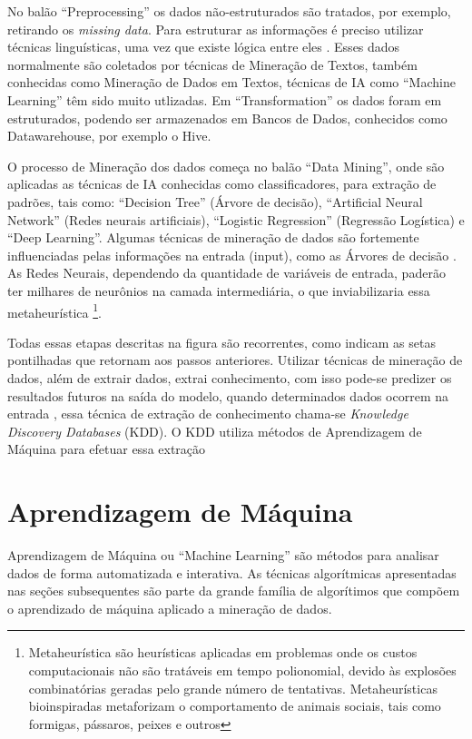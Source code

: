 No balão ``Preprocessing'' os dados não-estruturados são tratados, por exemplo, retirando os \textit{missing data}. 
Para estruturar as informações é preciso utilizar técnicas linguísticas, uma vez que existe lógica entre eles \cite{Aranha2006}.
Esses dados normalmente são coletados por técnicas de Mineração de Textos, também conhecidas como Mineração de Dados em Textos, técnicas de IA como ``Machine Learning'' 
têm sido muito utlizadas. Em ``Transformation'' os dados foram em estruturados, podendo ser armazenados em Bancos de Dados, conhecidos como Datawarehouse, por exemplo o Hive. 

O processo de Mineração dos dados começa no balão ``Data Mining'', onde são aplicadas as técnicas de IA conhecidas como classificadores, para extração de padrões, tais como: 
``Decision Tree'' (Árvore de decisão), ``Artificial Neural Network'' (Redes neurais artificiais), ``Logistic Regression'' (Regressão Logística) e ``Deep Learning''.
Algumas técnicas de mineração de dados são fortemente influenciadas pelas informações na entrada (input), como as Árvores de decisão \cite{DecisionTree}. 
As Redes Neurais, dependendo da quantidade de variáveis de entrada, paderão ter milhares de neurônios na camada intermediária, o que inviabilizaria essa metaheurística 
\footnote{Metaheurística são heurísticas aplicadas em problemas onde os custos computacionais não são tratáveis em tempo polionomial, devido às explosões combinatórias geradas
pelo grande número de tentativas. Metaheurísticas bioinspiradas metaforizam o comportamento de animais sociais, tais como formigas, pássaros, peixes e outros}.

Todas essas etapas descritas na figura são recorrentes, como indicam as setas pontilhadas que retornam aos passos anteriores.
Utilizar técnicas de mineração de dados, além de extrair dados, extrai conhecimento, com isso pode-se predizer os resultados futuros na saída do modelo, 
quando determinados dados ocorrem na entrada \cite{Amin2015a}, essa técnica de extração de conhecimento chama-se \textit{Knowledge Discovery Databases} (KDD).
O KDD utiliza métodos de Aprendizagem de Máquina para efetuar essa extração

\pagebreak

\section{Aprendizagem de Máquina}\label{arte:palavraChave:Machine}

Aprendizagem de Máquina ou ``Machine Learning'' são métodos para analisar dados de forma automatizada e interativa.
As técnicas algorítmicas apresentadas nas seções subsequentes são parte da grande família de algorítimos que compõem 
o aprendizado de máquina aplicado a mineração de dados.

